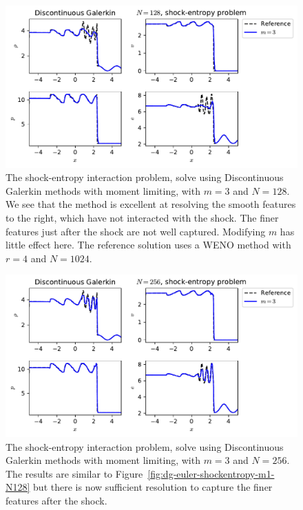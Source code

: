 \begin{figure}[t]
\centering
\includegraphics[width=0.8\linewidth]{dg_shock_entropy_m3_N128}
\caption[Discontinuous Galerkin methods applied to the shock-entropy problem, low resolution]
{\label{fig:dg-euler-shockentropy-m3-N128} The shock-entropy interaction problem,
solve using Discontinuous Galerkin methods with moment limiting, with $m=3$ and
$N=128$. We see that the method is excellent at resolving the smooth features to
the right, which have not interacted with the shock. The finer features just
after the shock are not well captured. Modifying $m$ has little effect here. The
reference solution uses a WENO method with $r=4$ and $N=1024$.\\
}
\end{figure}
%

\begin{figure}[t]
\centering
\includegraphics[width=0.8\linewidth]{dg_shock_entropy_m3_N256}
\caption[Discontinuous Galerkin methods applied to the shock-entropy problem, high resolution]
{\label{fig:dg-euler-shockentropy-m3-N256} The shock-entropy interaction problem,
solve using Discontinuous Galerkin methods with moment limiting, with $m=3$ and
$N=256$. The results are similar to Figure~\ref{fig:dg-euler-shockentropy-m1-N128}
but there is now sufficient resolution to capture the finer features after the
shock.\\
}
\end{figure}
%

